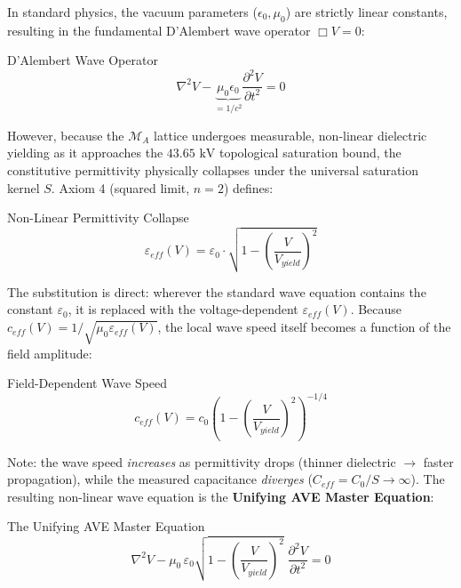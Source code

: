 In standard physics, the vacuum parameters ($\epsilon_0, \mu_0$) are strictly linear constants, resulting in the fundamental D'Alembert wave operator $\Box V = 0$:
\begin{resultbox}{D'Alembert Wave Operator}
\begin{equation}
\nabla^2 V - \underbrace{\mu_0 \epsilon_0}_{= 1/c^2} \frac{\partial^2 V}{\partial t^2} = 0
\end{equation}
\end{resultbox}

However, because the $\mathcal{M}_A$ lattice undergoes measurable, non-linear dielectric yielding as it approaches the $43.65\text{ kV}$ topological saturation bound, the constitutive permittivity physically collapses under the universal saturation kernel $S$. Axiom 4 (squared limit, $n=2$) defines:
\begin{resultbox}{Non-Linear Permittivity Collapse}
\begin{equation}
\varepsilon_{eff}(V) = \varepsilon_0 \cdot \sqrt{1 - \left(\frac{V}{V_{yield}}\right)^2}
\end{equation}
\end{resultbox}

The substitution is direct: wherever the standard wave equation contains the constant $\varepsilon_0$, it is replaced with the voltage-dependent $\varepsilon_{eff}(V)$. Because $c_{eff}(V) = 1/\sqrt{\mu_0 \varepsilon_{eff}(V)}$, the local wave speed itself becomes a function of the field amplitude:
\begin{resultbox}{Field-Dependent Wave Speed}
\begin{equation}
c_{eff}(V) = c_0 \left(1 - \left(\frac{V}{V_{yield}}\right)^2\right)^{-1/4}
\end{equation}
\end{resultbox}

Note: the wave speed \emph{increases} as permittivity drops (thinner dielectric $\to$ faster propagation), while the measured capacitance \emph{diverges} ($C_{eff} = C_0/S \to \infty$). The resulting non-linear wave equation is the \textbf{Unifying AVE Master Equation}:
\begin{resultbox}{The Unifying AVE Master Equation}
\begin{equation}
\label{eq:master_wave}
\nabla^2 V - \mu_0 \, \varepsilon_0 \sqrt{1 - \left(\frac{V}{V_{yield}}\right)^2}
\;\frac{\partial^2 V}{\partial t^2} = 0
\end{equation}
\end{resultbox}

